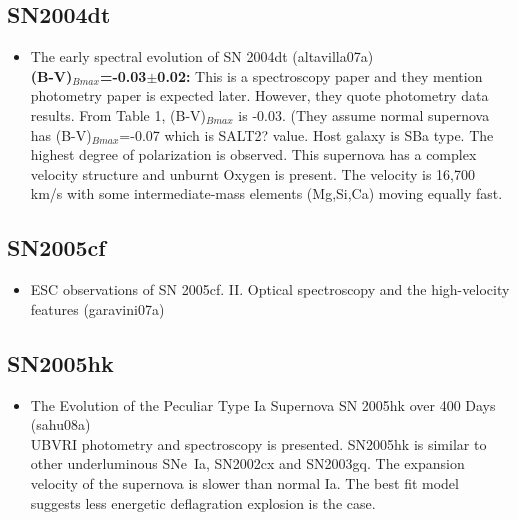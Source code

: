 \subsection{\bf SN2004dt}
\begin{itemize}
\item The early spectral evolution of SN 2004dt (altavilla07a) \citet{altavilla07a}\\
{\bf (B-V)$_{Bmax}$=-0.03$\pm$0.02:} 
This is a spectroscopy paper and they mention photometry paper is expected later.
However, they quote photometry data results.  From Table 1, (B-V)$_{Bmax}$ is -0.03.
(They assume normal supernova has (B-V)$_{Bmax}$=-0.07 which is SALT2? value.
Host galaxy is SBa type.  The highest degree of polarization is observed.
This supernova has a complex velocity structure and unburnt Oxygen is present.
The velocity is 16,700 km/s with some intermediate-mass elements (Mg,Si,Ca)
moving equally fast.
\end{itemize}

\subsection{\bf SN2005cf}
\begin{itemize}
\item ESC observations of SN 2005cf. II. Optical spectroscopy and the high-velocity features
(garavini07a) \citet{garavini07a}
\end{itemize}

\subsection{\bf SN2005hk}
\begin{itemize}
\item  The Evolution of the Peculiar Type Ia Supernova SN 2005hk over 400 Days (sahu08a)
\citet{sahu08a}\\
UBVRI photometry and spectroscopy is presented.  SN2005hk is similar to other
underluminous SNe~Ia, SN2002cx and SN2003gq.  The expansion velocity of the 
supernova is slower than normal Ia.  The best fit model suggests less energetic
deflagration explosion is the case.
\end{itemize}

